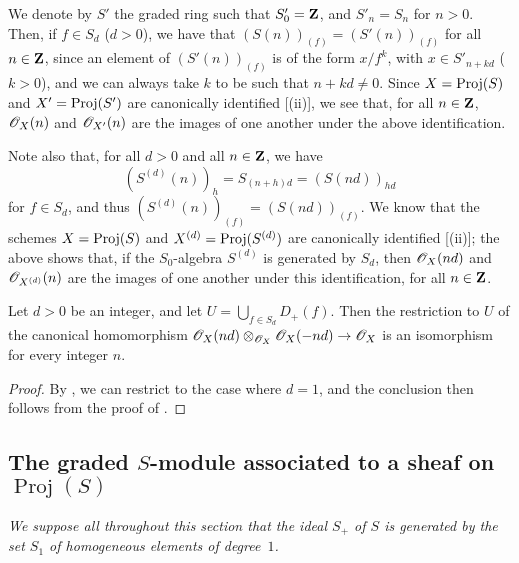 \begin{env}[2.5.16]
\label{II.2.5.16}
We denote by $S'$ the graded ring such that $S'_0=\mathbf{Z}$, and $S'_n=S_n$ for $n>0$.
Then, if $f\in S_d$ ($d>0$), we have that $(S(n))_{(f)}=(S'(n))_{(f)}$ for all $n\in\mathbf{Z}$, since an element of $(S'(n))_{(f)}$ is of the form $x/f^k$, with $x\in S'_{n+kd}$ ($k>0$), and we can always take $k$ to be such that $n+kd\neq0$.
Since $X=\operatorname{Proj}(S)$ and $X'=\operatorname{Proj}(S')$ are canonically identified [(ii)], we see that, for all $n\in\mathbf{Z}$, $\mathscr{O}_X(n)$ and $\mathscr{O}_{X'}(n)$ are the images of one another under the above identification.

Note also that, for all $d>0$ and all $n\in\mathbf{Z}$, we have
\[
  (S^{(d)}(n))_h = S_{(n+h)d} = (S(nd))_{hd}
\]
for $f\in S_d$, and thus $(S^{(d)}(n))_{(f)}=(S(nd))_{(f)}$.
We know that the schemes $X=\operatorname{Proj}(S)$ and $X^{(d)}=\operatorname{Proj}(S^{(d)})$ are canonically identified [(ii)];
the above shows that, if the $S_0$-algebra $S^{(d)}$ is generated by $S_d$, then $\mathscr{O}_X(nd)$ and $\mathscr{O}_{X^{(d)}}(n)$ are the images of one another under this identification, for all $n\in\mathbf{Z}$.
\end{env}

\begin{proposition}[2.5.17]
\label{II.2.5.17}
Let $d>0$ be an integer, and let $U=\bigcup_{f\in S_d}D_+(f)$.
Then the restriction to $U$ of the canonical homomorphism $\sh{O}_X(nd)\otimes_{\sh{O}_X}\sh{O}_X(-nd)\to\sh{O}_X$ is an isomorphism for every integer $n$.
\end{proposition}

\begin{proof}
By , we can restrict to the case where $d=1$, and the conclusion then follows from the proof of .
\end{proof}


\subsection{The graded $S$-module associated to a sheaf on $\operatorname{Proj}(S)$}
\label{subsection:II.2.6}

\emph{We suppose all throughout this section that the ideal $S_+$ of $S$ is generated by the set $S_1$ of homogeneous elements of degree~$1$.}

\begin{env}[2.6.1]
\label{II.2.6.1}
\end{env}
